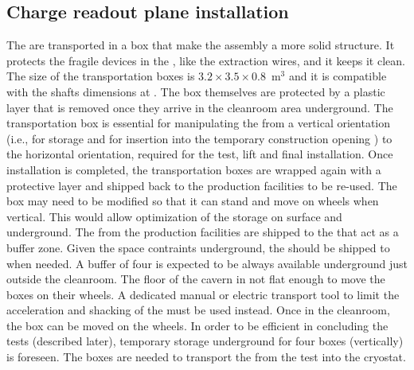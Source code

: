 \subsection{Charge readout plane installation}
The  are transported in a box that make the  assembly a more solid structure. It protects the fragile devices in the , like the extraction wires, and it keeps it clean.
The size of the transportation boxes is $3.2\times3.5\times0.8$~m$^3$ and it is compatible with the shafts dimensions at .
The box themselves are protected by a plastic layer that is removed once they arrive in the cleanroom area underground.
The transportation box is essential for manipulating the  from a vertical orientation (i.e., for storage and for insertion into the temporary construction opening ) to the horizontal orientation, required for the  \coldbox test, lift and final installation.
Once installation is completed, the transportation boxes are wrapped again with a protective layer and shipped back to the production facilities to be re-used.
The  box may need to be modified so that it can stand and move on wheels when vertical.
This would allow optimization of the storage on surface and underground.
The  from the production facilities are shipped to the  that act as a buffer zone.
Given the space contraints underground, the  should be shipped to  when needed.
A buffer of four  is expected to be always available underground just outside the cleanroom.
The floor of the cavern in not flat enough to move the  boxes on their wheels.
A dedicated manual or electric transport tool to limit the acceleration and shacking of the  must be used instead.
Once in the cleanroom, the box can be moved on the wheels.
In order to be efficient in concluding the  \coldbox tests (described later), temporary storage underground for four boxes (vertically) is foreseen.
The boxes are needed to transport the  from the \coldbox test into the cryostat.

